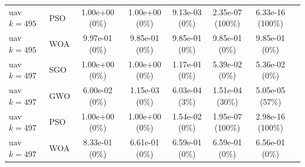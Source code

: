 \begin{table}[htbp]
{\begin{tabular}{@{}llcccccc@{}}
uav $k{=}495$ & PSO & 1.00e+00 (0\%) & 1.00e+00 (0\%) & 9.13e-03 (0\%) & 2.35e-07 (100\%) & 6.33e-16 (100\%) \\
uav $k{=}495$ & WOA & 9.97e-01 (0\%) & 9.85e-01 (0\%) & 9.85e-01 (0\%) & 9.85e-01 (0\%) & 9.85e-01 (0\%) \\
\midrule
uav $k{=}497$ & SGO & 1.00e+00 (0\%) & 1.00e+00 (0\%) & 1.17e-01 (0\%) & 5.39e-02 (0\%) & 5.36e-02 (0\%) \\
uav $k{=}497$ & GWO & 6.00e-02 (0\%) & 1.15e-03 (0\%) & 6.03e-04 (3\%) & 1.51e-04 (30\%) & 5.05e-05 (57\%) \\
uav $k{=}497$ & PSO & 1.00e+00 (0\%) & 1.00e+00 (0\%) & 1.54e-02 (0\%) & 1.95e-07 (100\%) & 2.98e-16 (100\%) \\
uav $k{=}497$ & WOA & 8.33e-01 (0\%) & 6.61e-01 (0\%) & 6.59e-01 (0\%) & 6.59e-01 (0\%) & 6.56e-01 (0\%) \\
\bottomrule
\end{tabular}}
\end{table}
